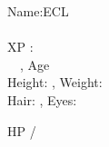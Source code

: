 \documentclass[article,10pt]{letter}
\newcommand{\afterenum}{\everypar{\parindent=0pt\hangindent=1em}}
\begin{document}






\begingroup
\fontfamily{\ttdefault}\selectfont
\raggedright
\afterenum
Name:\charname \hfill ECL  \\
\charrace \ \charclass \\
{XP :}  \\
\charalignment \ \charsize \ \chartype, {Age} \\

{Height:} \charheight, {Weight:} \charweight \\
{Hair:} \charhair, {Eyes:} \chareyes\\
\vspace{1mm}

\vspace{1mm}

{HP}  / \\
\end{document}
